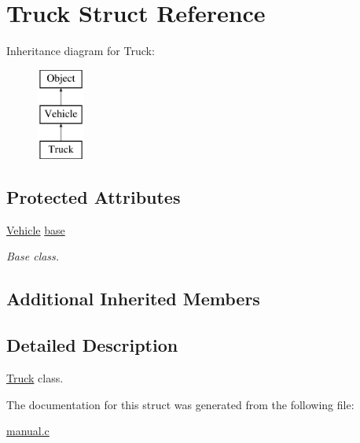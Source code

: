 \hypertarget{struct_truck}{\section{Truck Struct Reference}
\label{struct_truck}
}
Inheritance diagram for Truck\-:\begin{figure}[H]
\begin{center}
\leavevmode
\includegraphics[height=3.000000cm]{struct_truck}
\end{center}
\end{figure}
\subsection*{Protected Attributes}
\begin{DoxyCompactItemize}
\item 
\hypertarget{struct_truck_ad0ac321609dda1a6c552488b05ec7ac8}{\hyperlink{struct_vehicle}{Vehicle} \hyperlink{struct_truck_ad0ac321609dda1a6c552488b05ec7ac8}{base}}\label{struct_truck_ad0ac321609dda1a6c552488b05ec7ac8}

\begin{DoxyCompactList}\small\item\em Base class. \end{DoxyCompactList}\end{DoxyCompactItemize}
\subsection*{Additional Inherited Members}


\subsection{Detailed Description}
\hyperlink{struct_truck}{Truck} class. 

The documentation for this struct was generated from the following file\-:\begin{DoxyCompactItemize}
\item 
\hyperlink{manual_8c}{manual.\-c}\end{DoxyCompactItemize}
